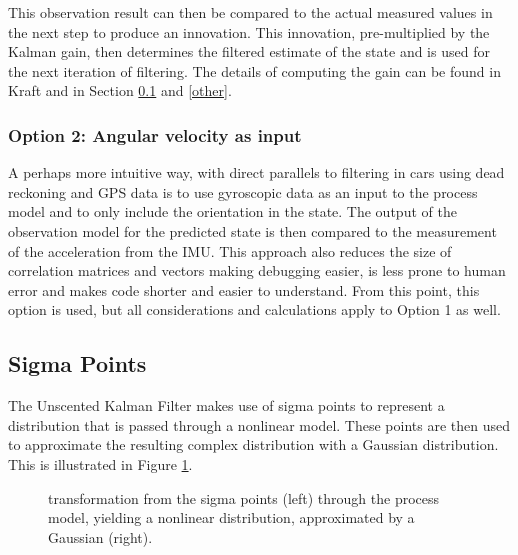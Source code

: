 \documentclass[letterpaper, 10 pt, conference]{ieeeconf}  %
\begin{document}
This observation result can then be compared to the actual measured values in the next step to produce an innovation. This innovation, pre-multiplied by the Kalman gain, then determines the filtered estimate of the state and is used for the next iteration of filtering. The details of computing the gain can be found in Kraft \cite{c1} and in Section \ref{sigma} and \ref{other}.

\subsubsection{Option 2: Angular velocity as input}
A perhaps more intuitive way, with direct parallels to filtering in cars using dead reckoning and GPS data is to use gyroscopic data as an input to the process model and to only include the orientation in the state. The output of the observation model for the predicted state is then compared to the measurement of the acceleration from the IMU. This approach also reduces the size of correlation matrices and vectors making debugging easier, is less prone to human error and makes code shorter and easier to understand. From this point, this option is used, but all considerations and calculations apply to Option 1 as well.

\subsection{Sigma Points} \label{sigma}
The Unscented Kalman Filter makes use of sigma points to represent a distribution that is passed through a nonlinear model. These points are then used to approximate the resulting complex distribution with a Gaussian distribution. This is illustrated in Figure \ref{distribution}.
   \begin{figure}[thpb]
      \centering
      
      \caption{transformation from the sigma points (left) through the process model, yielding a nonlinear distribution, approximated by a Gaussian (right).}
      \label{distribution}
   \end{figure}
\end{document}

